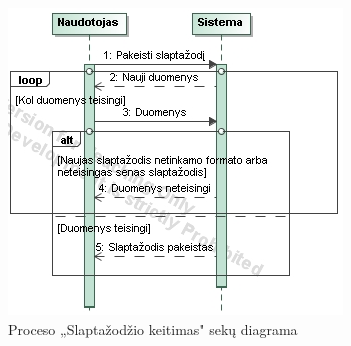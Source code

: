 \documentclass{VUMIFPSkursinis}
\begin{document}
\begin{figure}[H]
\centering
\includegraphics[scale=1, frame]{img/slkeitimas.png}
\caption{Proceso „Slaptažodžio keitimas" sekų diagrama}
\end{figure}
\end{document}
